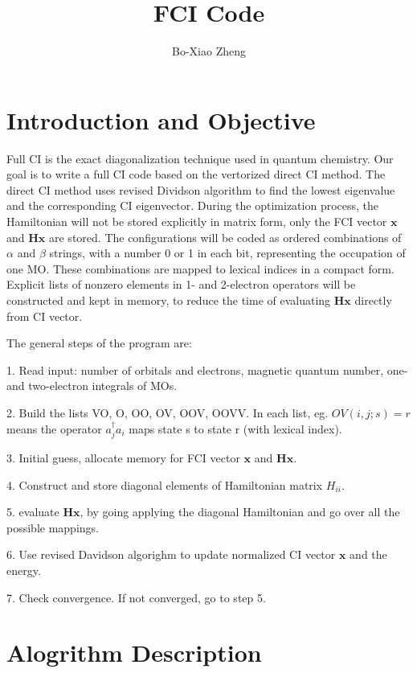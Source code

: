 \documentclass[twocolumn]{article}
\begin{document}
\title{FCI Code}
\author{Bo-Xiao Zheng}
\maketitle
\section{Introduction and Objective}
Full CI is the exact diagonalization technique used in quantum chemistry. Our goal is to write a full CI code based on the vertorized direct CI method.\cite{bendazzoli:3141}
The direct CI method uses revised Dividson algorithm\cite{Davidson1975} to find the lowest eigenvalue and the corresponding CI eigenvector. 
During the optimization process, the Hamiltonian will not be stored explicitly in matrix form, only the FCI vector $\mathbf{x}$ and $\mathbf{Hx}$ are stored.
The configurations will be coded as ordered combinations of $\alpha$ and $\beta$ strings, with a number 0 or 1 in each bit, representing the occupation of one MO.
These combinations are mapped to lexical indices in a compact form.\cite{Duch1985} Explicit lists of nonzero elements in 1- and 2-electron operators
will be constructed and kept in memory, to reduce the time of evaluating $\mathbf{Hx}$ directly from CI vector.

The general steps of the program are:

1. Read input: number of orbitals and electrons, magnetic quantum number, one- and two-electron integrals of MOs.

2. Build the lists VO, O, OO, OV, OOV, OOVV. In each list, eg. $OV(i,j;s)=r$ means the operator $a_j^{\dagger}a_i$ maps state s to state r (with lexical index).

3. Initial guess, allocate memory for FCI vector $\mathbf{x}$ and $\mathbf{Hx}$.

4. Construct and store diagonal elements of Hamiltonian matrix $H_{ii}$.

5. evaluate $\mathbf{Hx}$, by going applying the diagonal Hamiltonian and go over all the possible mappings.

6. Use revised Davidson algorighm to update normalized CI vector $\mathbf{x}$ and the energy.

7. Check convergence. If not converged, go to step 5.

\section{Alogrithm Description}
\end{document}
